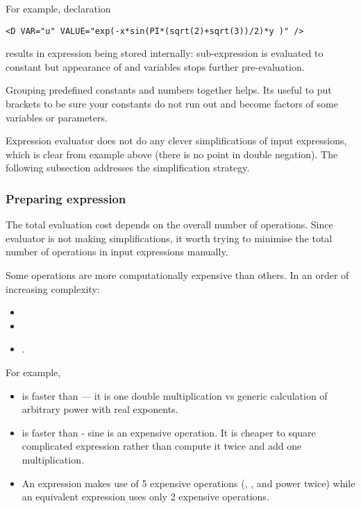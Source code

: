 For example, declaration 
\begin{lstlisting}[style=XMLStyle]
     <D VAR="u" VALUE="exp(-x*sin(PI*(sqrt(2)+sqrt(3))/2)*y )" />
\end{lstlisting}
results in expression  being
stored internally: sub-expression  is
evaluated to constant but appearance of  and  variables
stops further pre-evaluation.

Grouping predefined constants and numbers together helps. Its useful to put
brackets to be sure your constants do not run out and become factors of some
variables or parameters.

Expression evaluator does not do any clever simplifications of input
expressions, which is clear from example above (there is no point in double
negation). The following subsection addresses the simplification strategy.

\subsubsection{Preparing expression}

The total evaluation cost depends on the overall number of operations. Since
evaluator is not making simplifications, it worth trying to minimise the total
number of operations in input expressions manually.

Some operations are more computationally expensive than others. In an order of
increasing complexity:
\begin{itemize}
\item \inlsh{+, -, <, >, <=, >=, ==, }
\item {}
\item {}.
\end{itemize}

For example,
\begin{itemize}
\item {} is faster than  --- it is one double
multiplication vs generic calculation of arbitrary power with real exponents.
\item {} is faster than  -
sine is an expensive operation. It is cheaper to square complicated expression rather than
 compute it twice and add one multiplication.
\item An expression
 makes use of 5 expensive operations (, , 
 and power \inlsh{\^{}} twice) while an equivalent expression
 uses only 2 expensive operations.
\end{itemize}

